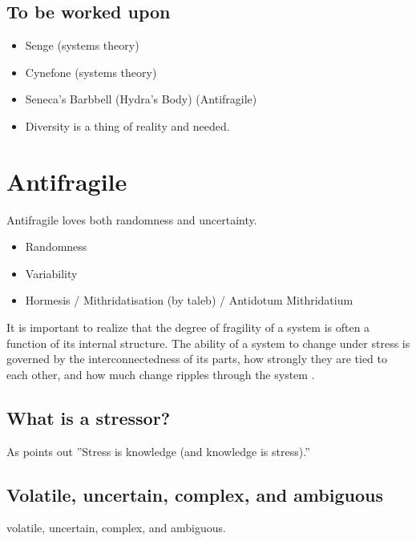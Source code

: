 \subsection{To be worked upon}

\begin{itemize}
	\item{Senge (systems theory)}
	\item{Cynefone (systems theory)}
	\item{Seneca's Barbbell (Hydra's Body) (Antifragile)}
	\item{Diversity is a thing of reality and needed.}
\end{itemize}

\section{Antifragile}
\label{sec:tbantifragile}

Antifragile loves both randomness and uncertainty.

\begin{itemize}
	\item{Randomness}
	\item{Variability}
	\item{Hormesis / Mithridatisation (by taleb) / Antidotum Mithridatium}
\end{itemize}

It is important to realize that the degree of \gls{fragility} of a system is often a function of its internal structure. The ability of a system to change under stress is governed by the interconnectedness of its parts, how strongly they are tied to each other, and how much change ripples through the system \parencite[p. 886]{OReilly2019}.\\



\subsection{What is a stressor?}
\label{sub:stressor}
As \textcite[p. 54]{Taleb2012} points out ''Stress is knowledge (and knowledge is stress).''

\subsection{Volatile, uncertain, complex, and ambiguous}
\label{seb:tbvuca}

\Gls{volatile}, \gls{uncertain}, \gls{complex}, and \gls{ambiguous}.

